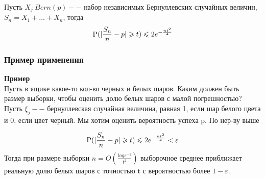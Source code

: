\begin{theorem*}[следствие]
    Пусть $X_j ~ Bern(p) --$ набор независимых Бернуллевских случайных величин, $S_n = X_1 + \dots + X_n$, тогда
    \begin{equation*}
        \P(|\frac{S_n}{n} - p| \geq t) \leq 2e^{-\frac{nt^2}{4}}
    \end{equation*}
\end{theorem*}

\subsubsection{Пример применения}
\textbf{Пример}\\
Пусть в ящике какое-то кол-во черных и белых шаров. Каким должен быть размер выборки, чтобы оценить долю белых шаров с малой погрешностью? Пусть $\xi_j -- $ бернуллевская случайная величина, равная 1, если шар белого цвета и 0, если цвет черный. Мы хотим оценить вероятность успеха p. По нер-ву выше

\begin{equation*}
    \P(|\frac{S_n}{n} - p| \geq t) \leq 2e^{-\frac{nt^2}{4}} < \varepsilon
\end{equation*}
Тогда при размере выборки $n = O(\frac{log\varepsilon^{-1}}{t^2})$ выборочное среднее приближает реальную долю белых шаров с точностью t с вероятностью более $1 - \varepsilon$.



